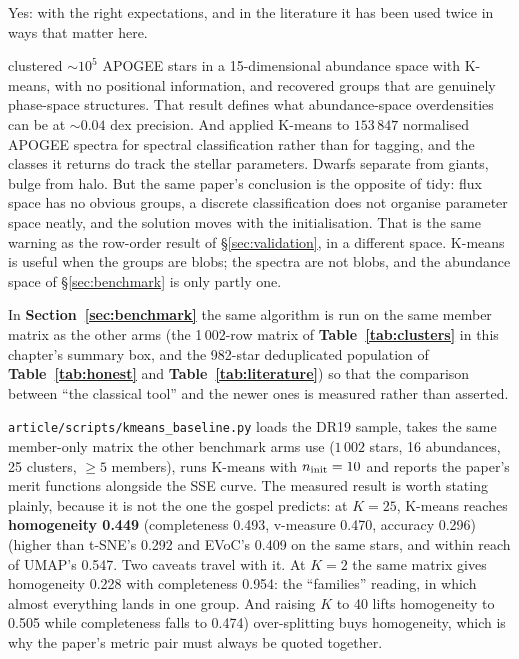 Yes: with the right expectations, and in the literature it has been used twice
in ways that matter here.

\citet{Hogg:16} clustered $\sim\!10^5$ APOGEE stars in a 15-dimensional
abundance space with K-means, with no positional information, and recovered
groups that are genuinely phase-space structures. That result defines what
abundance-space overdensities can be at $\sim\!0.04$ dex precision. And
\citet{GarciaDias:18} applied K-means to $153\,847$ normalised APOGEE spectra
for spectral classification rather than for tagging, and the classes it returns
do track the stellar parameters. Dwarfs separate from giants, bulge from halo.
But the same paper's conclusion is the opposite of tidy: flux space has no
obvious groups, a discrete classification does not organise parameter space
neatly, and the solution moves with the initialisation. That is the same
warning as the row-order result of \S\ref{sec:validation}, in a different
space. K-means is useful when the groups are blobs; the spectra are not blobs,
and the abundance space of \S\ref{sec:benchmark} is only partly one.

In \textbf{Section~\ref{sec:benchmark}} the same algorithm is run on the same
member matrix as the other arms (the 1\,002-row matrix of
\textbf{Table~\ref{tab:clusters}} in this chapter's summary box, and the
982-star deduplicated population of \textbf{Table~\ref{tab:honest}} and
\textbf{Table~\ref{tab:literature}}) so that the comparison between ``the
classical tool'' and the newer ones is measured rather than asserted.

\begin{summary}
\texttt{article/scripts/kmeans\_baseline.py} loads the DR19 sample, takes the
same member-only matrix the other benchmark arms use ($1\,002$ stars, 16
abundances, 25 clusters, $\geq\!5$ members), runs K-means with $n_{\rm
init}=10$ and reports the paper's merit functions alongside the SSE curve. The
measured result is worth stating plainly, because it is not the one the gospel
predicts: at $K=25$, K-means reaches \textbf{homogeneity 0.449} (completeness
0.493, v-measure 0.470, accuracy 0.296) (higher than t-SNE's 0.292 and EVoC's
0.409 on the same stars, and within reach of UMAP's 0.547. Two caveats travel
with it. At $K=2$ the same matrix gives homogeneity 0.228 with completeness
0.954: the ``families'' reading, in which almost everything lands in one group.
And raising $K$ to 40 lifts homogeneity to 0.505 while completeness falls to
0.474) over-splitting buys homogeneity, which is why the paper's metric pair
must always be quoted together.
\end{summary}

